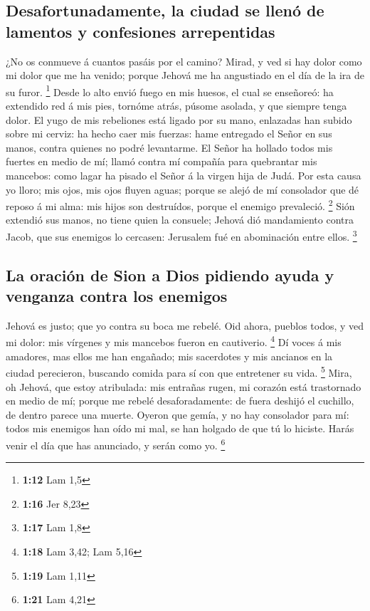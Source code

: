 \hypertarget{desafortunadamente-la-ciudad-se-llenuxf3-de-lamentos-y-confesiones-arrepentidas}{%
\subsection{Desafortunadamente, la ciudad se llenó de lamentos y
confesiones
arrepentidas}\label{desafortunadamente-la-ciudad-se-llenuxf3-de-lamentos-y-confesiones-arrepentidas}}

 ¿No os conmueve á cuantos pasáis por el camino? Mirad, y
ved si hay dolor como mi dolor que me ha venido; porque Jehová me ha
angustiado en el día de la ira de su furor. \footnote{\textbf{1:12} Lam
  1,5}  Desde lo alto envió fuego en mis huesos, el cual se
enseñoreó: ha extendido red á mis pies, tornóme atrás, púsome asolada, y
que siempre tenga dolor.  El yugo de mis rebeliones está
ligado por su mano, enlazadas han subido sobre mi cerviz: ha hecho caer
mis fuerzas: hame entregado el Señor en sus manos, contra quienes no
podré levantarme.  El Señor ha hollado todos mis fuertes en
medio de mí; llamó contra mí compañía para quebrantar mis mancebos: como
lagar ha pisado el Señor á la virgen hija de Judá.  Por
esta causa yo lloro; mis ojos, mis ojos fluyen aguas; porque se alejó de
mí consolador que dé reposo á mi alma: mis hijos son destruídos, porque
el enemigo prevaleció. \footnote{\textbf{1:16} Jer 8,23} 
Sión extendió sus manos, no tiene quien la consuele; Jehová dió
mandamiento contra Jacob, que sus enemigos lo cercasen: Jerusalem fué en
abominación entre ellos. \footnote{\textbf{1:17} Lam 1,8}

\hypertarget{la-oraciuxf3n-de-sion-a-dios-pidiendo-ayuda-y-venganza-contra-los-enemigos}{%
\subsection{La oración de Sion a Dios pidiendo ayuda y venganza contra
los
enemigos}\label{la-oraciuxf3n-de-sion-a-dios-pidiendo-ayuda-y-venganza-contra-los-enemigos}}

 Jehová es justo; que yo contra su boca me rebelé. Oid
ahora, pueblos todos, y ved mi dolor: mis vírgenes y mis mancebos fueron
en cautiverio. \footnote{\textbf{1:18} Lam 3,42; Lam 5,16} 
Dí voces á mis amadores, mas ellos me han engañado; mis sacerdotes y mis
ancianos en la ciudad perecieron, buscando comida para sí con que
entretener su vida. \footnote{\textbf{1:19} Lam 1,11} 
Mira, oh Jehová, que estoy atribulada: mis entrañas rugen, mi corazón
está trastornado en medio de mí; porque me rebelé desaforadamente: de
fuera deshijó el cuchillo, de dentro parece una muerte. 
Oyeron que gemía, y no hay consolador para mí: todos mis enemigos han
oído mi mal, se han holgado de que tú lo hiciste. Harás venir el día que
has anunciado, y serán como yo. \footnote{\textbf{1:21} Lam 4,21}

